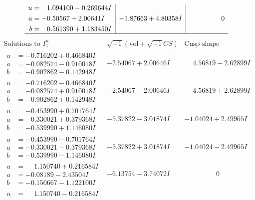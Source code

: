 \documentclass[1p]{elsarticle_modified}
\theoremstyle{definition}
\newcommand{\I}{\sqrt{-1}}
\begin{document}
$$\begin{array}{c|c|c}
\begin{aligned}
u &= \phantom{-}1.094100 - 0.269644 I \\
a &= -0.50567 + 2.00641 I \\
b &= \phantom{-}0.561390 + 1.183450 I\end{aligned}
 & -1.87663 + 4.80358 I & \phantom{-0.000000 } 0\\
 \hline 
 \end{array}$$\newpage$$\begin{array}{c|c|c}  
\text{Solutions to }I^u_{1}& \I (\text{vol} + \sqrt{-1}CS) & \text{Cusp shape}\\
 \hline 
\begin{aligned}
u &= -0.716202 + 0.466840 I \\
a &= -0.082574 - 0.910018 I \\
b &= -0.902862 - 0.142948 I\end{aligned}
 & -2.54067 + 2.00646 I & \phantom{-}4.56819 - 2.62899 I \\ \hline\begin{aligned}
u &= -0.716202 - 0.466840 I \\
a &= -0.082574 + 0.910018 I \\
b &= -0.902862 + 0.142948 I\end{aligned}
 & -2.54067 - 2.00646 I & \phantom{-}4.56819 + 2.62899 I \\ \hline\begin{aligned}
u &= -0.453990 + 0.701764 I \\
a &= -0.330021 + 0.379368 I \\
b &= -0.539990 + 1.146080 I\end{aligned}
 & -5.37822 - 3.01874 I & -1.04024 + 2.49965 I \\ \hline\begin{aligned}
u &= -0.453990 - 0.701764 I \\
a &= -0.330021 - 0.379368 I \\
b &= -0.539990 - 1.146080 I\end{aligned}
 & -5.37822 + 3.01874 I & -1.04024 - 2.49965 I \\ \hline\begin{aligned}
u &= \phantom{-}1.150740 + 0.216584 I \\
a &= -0.08189 - 2.43504 I \\
b &= -0.150667 - 1.122100 I\end{aligned}
 & -6.13754 - 3.74072 I & \phantom{-0.000000 } 0 \\ \hline\begin{aligned}
u &= \phantom{-}1.150740 - 0.216584 I \\

\end{aligned}
\end{array}$$
\end{document}
